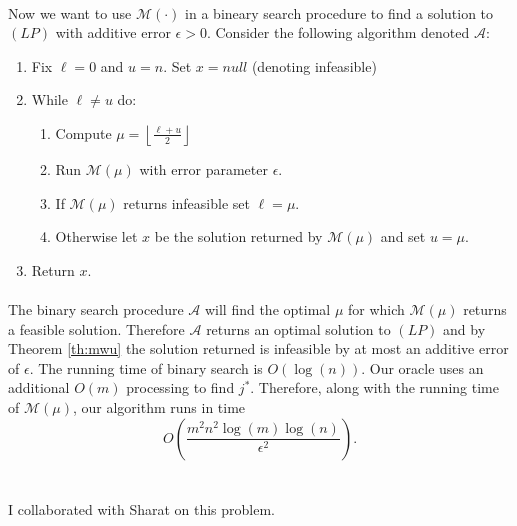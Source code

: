 \documentclass[letterpaper,12pt,oneside,onecolumn]{article}
\newcommand{\cA}{\mathcal{A}} \newcommand{\cB}{\mathcal{B}}
\newcommand{\cM}{\mathcal{M}} \newcommand{\cN}{\mathcal{N}}
\newcommand{\floor}[1]{\ensuremath{\left\lfloor#1\right\rfloor}}
\begin{document}
\paragraph{}
Now we want to use $\cM(\cdot)$ in a bineary search procedure to find a solution to $(LP)$ with additive error $\epsilon>0$. Consider the following algorithm denoted $\cA$:
\begin{enumerate}
\item Fix $\ell = 0$ and $u = n$. Set $x = null$ (denoting infeasible)
\item While $\ell \neq u$ do:
	\begin{enumerate}
	\item Compute $\mu = \floor{\frac{\ell + u}{2}}$
	\item Run $\cM(\mu)$ with error parameter $\epsilon$.
	\item If $\cM(\mu)$ returns infeasible set $\ell = \mu$.
	\item Otherwise let $x$ be the solution returned by $\cM(\mu)$ and set $u = \mu$.
	\end{enumerate}
\item Return $x$.
\end{enumerate}
\paragraph{}
The binary search procedure $\cA$ will find the optimal $\mu$ for which $\cM(\mu)$ returns a feasible solution. Therefore $\cA$ returns an optimal solution to $(LP)$ and by Theorem \ref{th:mwu} the solution returned is infeasible by at most an additive error of $\epsilon$. The running time of binary search is $O(\log(n))$. Our oracle uses an additional $O(m)$ processing to find $j^*$. Therefore, along with the running time of $\cM(\mu)$, our algorithm runs in time
$$O(\frac{m^2n^2\log(m)\log(n)}{\epsilon^2}).$$
\section{}

\section{}
\paragraph{}
I collaborated with Sharat on this problem.
\end{document}

